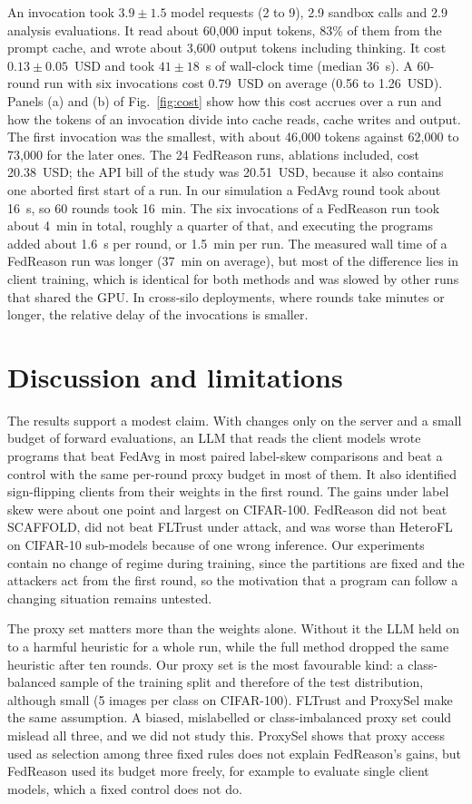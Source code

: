 \documentclass[3p,times,a4paper]{elsarticle}
\begin{document}
An invocation took $3.9\pm1.5$ model requests (2 to 9), 2.9 sandbox calls and 2.9 analysis evaluations. It read about 60{,}000 input tokens, 83\% of them from the prompt cache, and wrote about 3{,}600 output tokens including thinking. It cost $0.13\pm0.05$~USD and took $41\pm18$~s of wall-clock time (median 36~s). A 60-round run with six invocations cost 0.79~USD on average (0.56 to 1.26~USD). Panels (a) and (b) of Fig.~\ref{fig:cost} show how this cost accrues over a run and how the tokens of an invocation divide into cache reads, cache writes and output. The first invocation was the smallest, with about 46{,}000 tokens against 62{,}000 to 73{,}000 for the later ones. The 24 FedReason runs, ablations included, cost 20.38~USD; the API bill of the study was 20.51~USD, because it also contains one aborted first start of a run. In our simulation a FedAvg round took about 16~s, so 60 rounds took 16~min. The six invocations of a FedReason run took about 4~min in total, roughly a quarter of that, and executing the programs added about 1.6~s per round, or 1.5~min per run. The measured wall time of a FedReason run was longer (37~min on average), but most of the difference lies in client training, which is identical for both methods and was slowed by other runs that shared the GPU. In cross-silo deployments, where rounds take minutes or longer, the relative delay of the invocations is smaller.

\section{Discussion and limitations}
\label{sec:discussion}

The results support a modest claim. With changes only on the server and a small budget of forward evaluations, an LLM that reads the client models wrote programs that beat FedAvg in most paired label-skew comparisons and beat a control with the same per-round proxy budget in most of them. It also identified sign-flipping clients from their weights in the first round. The gains under label skew were about one point and largest on CIFAR-100. FedReason did not beat SCAFFOLD, did not beat FLTrust under attack, and was worse than HeteroFL on CIFAR-10 sub-models because of one wrong inference. Our experiments contain no change of regime during training, since the partitions are fixed and the attackers act from the first round, so the motivation that a program can follow a changing situation remains untested.

The proxy set matters more than the weights alone. Without it the LLM held on to a harmful heuristic for a whole run, while the full method dropped the same heuristic after ten rounds. Our proxy set is the most favourable kind: a class-balanced sample of the training split and therefore of the test distribution, although small (5 images per class on CIFAR-100). FLTrust and ProxySel make the same assumption. A biased, mislabelled or class-imbalanced proxy set could mislead all three, and we did not study this. ProxySel shows that proxy access used as selection among three fixed rules does not explain FedReason's gains, but FedReason used its budget more freely, for example to evaluate single client models, which a fixed control does not do.
\end{document}
